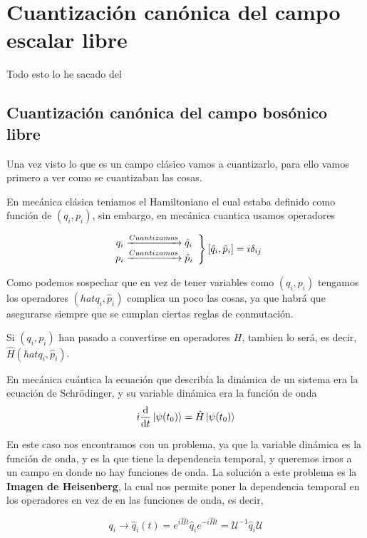 \setchapterpreamble[u]{\margintoc}
\chapter{Cuantización canónica del campo escalar libre}

\begin{center}
  \large Todo esto lo he sacado del \cite{Dobdado}
\end{center}
\section{Cuantización canónica del campo bosónico libre}

Una vez visto lo que es un campo clásico vamos a cuantizarlo, para ello vamos primero a ver como se cuantizaban las cosas. 

En mecánica clásica teniamos el Hamiltoniano el cual estaba definido como función de $(q_{i},p_{i})$, sin embargo, en mecánica cuantica usamos operadores

\[\left.\begin{array}{c}
  q_{i} \xrightarrow{Cuantizamos}\hat{q}_{i} \\
  p_{i} \xrightarrow{Cuantizamos}\hat{p}_{i}
\end{array}\right\} \comm{\hat{q}_{i}}{\hat{p}_{i}}=i\delta_{ij}\]

Como podemos sospechar que en vez de tener variables como $(q_{i},p_{i})$ tengamos los operadores $(hat{q}_{i},\hat{p}_{i})$ complica un poco las cosas, ya que habrá que asegurarse siempre que se cumplan ciertas reglas de conmutación.

Si $(q_{i},p_{i})$ han pasado a convertirse en operadores $H$, tambien lo será, es decir, $\hat{H}(hat{q}_{i},\hat{p}_{i})$. 

En mecánica cuántica la ecuación que describía la dinámica de un sistema era la ecuación de Schrödinger, y su variable dinámica era la función de onda 
\[i\dv{}{t}\ket{\psi(t_{0})}=\hat{H}\ket{\psi(t_{0})}\]

En este caso nos encontramos con un problema, ya que la variable dinámica es la función de onda, y es la que tiene la dependencia temporal, y queremos irnos a un campo en donde no hay funciones de onda. La solución a este problema es la \textbf{Imagen de Heisenberg}, la cual nos permite poner la dependencia temporal en los operadores en vez de en las funciones de onda, es decir, 

\[q_{i}\longrightarrow \hat{q}_{i}(t)=e^{i \hat{H}t}\hat{q}_{i}e^{-i \hat{H}t}=\mathcal{U}^{-1} \hat{q}_{i}\mathcal{U}\]

